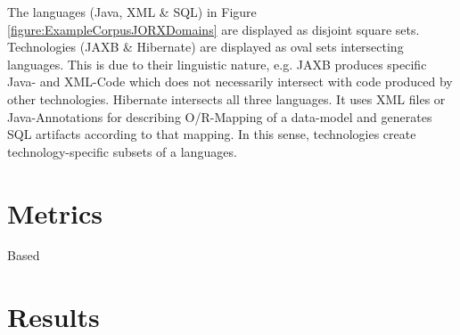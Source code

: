 The languages (\gls{Java}, \gls{XML} \& \gls{SQL}) in Figure \ref{figure:ExampleCorpusJORXDomains} are displayed as disjoint square sets.
Technologies (\gls{JAXB} \& \gls{Hibernate}) are displayed as oval sets intersecting languages.
This is due to their linguistic nature, e.g. \gls{JAXB} produces specific \Gls{Java}- and \gls{XML}-Code which does not necessarily intersect with code produced by other technologies.
\gls{Hibernate} intersects all three languages.
It uses \gls{XML} files or \gls{Java}-Annotations for describing \gls{O/R-Mapping} of a data-model and generates \gls{SQL} artifacts according to that mapping.
In this sense, technologies create technology-specific subsets of a languages.

\section{Metrics}
\label{section:Metrics}
Based

\section{Results}
\label{section:Results}

%
